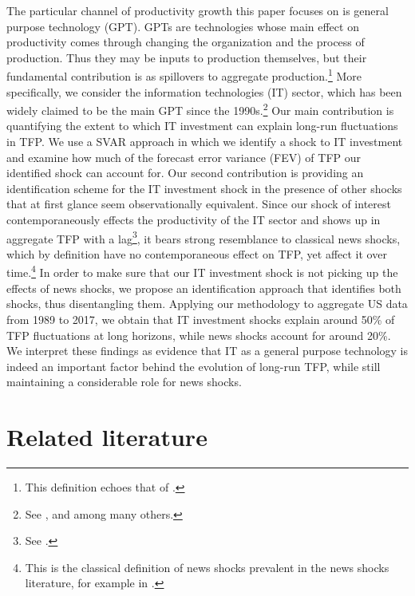 \documentclass[11pt]{article}
\renewcommand{\[}{\begin{equation}}
\renewcommand{\]}{\end{equation}}
\begin{document}
The particular channel of productivity growth this paper focuses on is general purpose technology (GPT). GPTs are technologies whose main effect on productivity comes through changing the organization and the process of production. Thus they may be inputs to production themselves, but their fundamental contribution is as spillovers to aggregate production.\footnote{This definition echoes that of \cite{bresnahan_trajtenberg1992}.} More specifically, we consider the information technologies (IT) sector, which has been widely claimed to be the main GPT since the 1990s.\footnote{See \cite{basu_etal2004}, \cite{brynjolfsson_etal1994} and \cite{allstar_paper} among many others.} Our main contribution is quantifying the extent to which IT investment can explain long-run fluctuations in TFP. We use a SVAR approach in which we identify a shock to IT investment and examine how much of the forecast error variance (FEV) of TFP our identified shock can account for. Our second contribution is providing an identification scheme for the IT investment shock in the presence of other shocks that at first glance seem observationally equivalent. Since our shock of interest contemporaneously effects the productivity of the IT sector and shows up in aggregate TFP with a lag\footnote{See \cite{david1989}.}, it bears strong resemblance to classical news shocks, which by definition have no contemporaneous effect on TFP, yet affect it over time.\footnote{This is the classical definition of news shocks prevalent in the news shocks literature, for example in \cite{beaudry_portier2006}.} In order to make sure that our IT investment shock is not picking up the effects of news shocks, we propose an identification approach that identifies both shocks, thus disentangling them. 
Applying our methodology to aggregate US data from 1989 to 2017, we obtain that IT investment shocks explain around 50\% of TFP fluctuations at long horizons, while news shocks account for around 20\%. We interpret these findings as evidence that IT as a general purpose technology is indeed an important factor behind the evolution of long-run TFP, while still maintaining a considerable role for news shocks. 


\section{Related literature}
\label{sec_related_lit}
\end{document}
